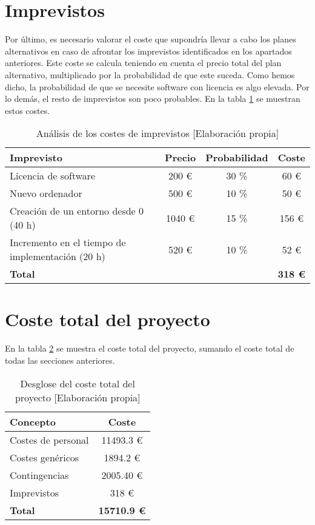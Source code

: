 \section{Imprevistos}

Por último, es necesario valorar el coste que supondría llevar a cabo los planes alternativos en caso de afrontar los imprevistos identificados en los apartados anteriores. Este coste se calcula teniendo en cuenta el precio total del plan alternativo, multiplicado por la probabilidad de que este suceda. Como hemos dicho, la probabilidad de que se necesite software con licencia es algo elevada. Por lo demás, el resto de imprevistos son poco probables. En la tabla \ref{tab:imprevistos} se muestran estos costes.

\begin{table}[ht]
    \begin{center}
        \begin{tabular}{ l  c  c  c }
        \textbf{Imprevisto} & \textbf{Precio} & \textbf{Probabilidad} & \textbf{Coste} \\
        \hline
        Licencia de software & 200 € & 30 \% & 60 € \\
        Nuevo ordenador & 500 € & 10 \%  & 50 € \\
        Creación de un entorno desde 0 (40 h) & 1040 € & 15 \% & 156 €\\
        Incremento en el tiempo de implementación (20 h) & 520 € & 10 \% & 52 € \\
        \hline
        \textbf{Total} & & & \textbf{318 €} \\
        \end{tabular}
        \caption{Análisis de los costes de imprevistos [Elaboración propia]}
        \label{tab:imprevistos}
    \end{center}
\end{table}

\section{Coste total del proyecto}
En la tabla \ref{tab:coste_total} se muestra el coste total del proyecto, sumando el coste total de todas las secciones anteriores.
\begin{table}[h]
    \begin{center}
        \begin{tabular}{ l  c }
        \textbf{Concepto} & \textbf{Coste} \\
        \hline
        Costes de personal      & 11493.3 € \\
        Costes genéricos        & 1894.2 €  \\
        Contingencias           & 2005.40 € \\
        Imprevistos             & 318 €  \\
        \hline
        \textbf{Total} & \textbf{15710.9 €} \\
        \end{tabular}
        \caption{Desglose del coste total del proyecto [Elaboración propia]}
        \label{tab:coste_total}
    \end{center}
\end{table}

